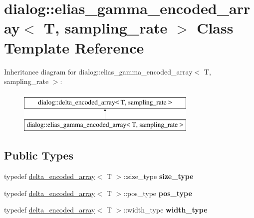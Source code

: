 \hypertarget{classdialog_1_1elias__gamma__encoded__array}{}\section{dialog\+:\+:elias\+\_\+gamma\+\_\+encoded\+\_\+array$<$ T, sampling\+\_\+rate $>$ Class Template Reference}
\label{classdialog_1_1elias__gamma__encoded__array}
Inheritance diagram for dialog\+:\+:elias\+\_\+gamma\+\_\+encoded\+\_\+array$<$ T, sampling\+\_\+rate $>$\+:\begin{figure}[H]
\begin{center}
\leavevmode
\includegraphics[height=2.000000cm]{classdialog_1_1elias__gamma__encoded__array}
\end{center}
\end{figure}
\subsection*{Public Types}
\begin{DoxyCompactItemize}
\item 
\mbox{\label{classdialog_1_1elias__gamma__encoded__array_af927003f739a0ac6da1237a6ee1d45d4}} 
typedef \hyperlink{classdialog_1_1delta__encoded__array}{delta\+\_\+encoded\+\_\+array}$<$ T $>$\+::size\+\_\+type {\bfseries size\+\_\+type}
\item 
\mbox{\label{classdialog_1_1elias__gamma__encoded__array_a50628026535248b75fb77dc60bf0161b}} 
typedef \hyperlink{classdialog_1_1delta__encoded__array}{delta\+\_\+encoded\+\_\+array}$<$ T $>$\+::pos\+\_\+type {\bfseries pos\+\_\+type}
\item 
\mbox{\label{classdialog_1_1elias__gamma__encoded__array_a430641490aac6e97f8df735b66cc6856}} 
typedef \hyperlink{classdialog_1_1delta__encoded__array}{delta\+\_\+encoded\+\_\+array}$<$ T $>$\+::width\+\_\+type {\bfseries width\+\_\+type}
\end{DoxyCompactItemize}
